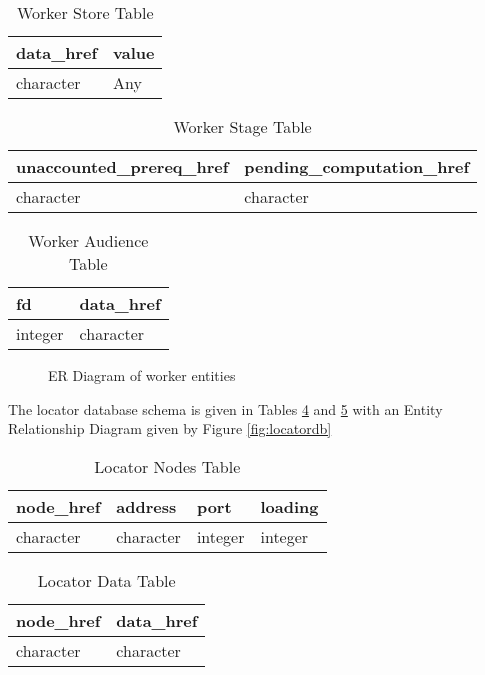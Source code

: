 \begin{table}[]
\caption{Worker Store Table}
\label{tbl:wstore}
\begin{tabular}{@{}ll@{}}
\toprule
data\_href & value \\ \midrule
character  & Any   \\ \bottomrule
\end{tabular}
\end{table}

\begin{table}[]
\caption{Worker Stage Table}
\label{tbl:wstage}
\begin{tabular}{@{}ll@{}}
\toprule
unaccounted\_prereq\_href & pending\_computation\_href \\ \midrule
character                 & character                  \\ \bottomrule
\end{tabular}
\end{table}

\begin{table}[]
\caption{Worker Audience Table}
\label{tbl:waudience}
\begin{tabular}{@{}ll@{}}
\toprule
fd      & data\_href \\ \midrule
integer & character  \\ \bottomrule
\end{tabular}
\end{table}


\begin{figure}

\caption{ER Diagram of worker entities}
\label{fig:workerdb}
\end{figure}

The locator database schema is given in Tables \ref{tbl:lnodes} and \ref{tbl:ldata} with an Entity Relationship Diagram given by Figure \ref{fig:locatordb}


\begin{table}[]
\caption{Locator Nodes Table}
\label{tbl:lnodes}
\begin{tabular}{@{}llll@{}}
\toprule
node\_href & address   & port    & loading \\ \midrule
character  & character & integer & integer \\ \bottomrule
\end{tabular}
\end{table}

\begin{table}[]
\caption{Locator Data Table}
\label{tbl:ldata}
\begin{tabular}{@{}ll@{}}
\toprule
node\_href & data\_href \\ \midrule
character  & character  \\ \bottomrule
\end{tabular}
\end{table}

